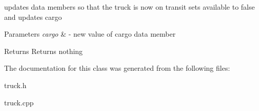 updates data members so that the truck is now on transit sets available to false and updates cargo 


\begin{DoxyParams}{Parameters}
{\em cargo} & -\/ new value of cargo data member \\
\hline
\end{DoxyParams}
\begin{DoxyReturn}{Returns}
Returns nothing 
\end{DoxyReturn}


The documentation for this class was generated from the following files\+:\begin{DoxyCompactItemize}
\item 
truck.\+h\item 
truck.\+cpp\end{DoxyCompactItemize}

